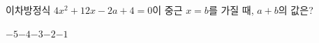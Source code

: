 이차방정식 $4x^2+12x-2a+4=0$이 중근 $x=b$를 가질 때, $a+b$의 값은? 
\begin{choices32}{$-5$}{$-4$}{$-3$}{$-2$}{$-1$}\end{choices32}
